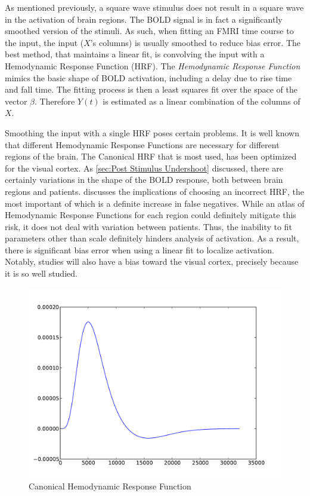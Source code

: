 As mentioned previously, a square wave stimulus 
does not result in a square wave in the activation of brain regions. 
The BOLD signal is in fact a significantly smoothed version of the 
stimuli. As such, when fitting an FMRI time course to the input,
the input ($X$'s columns) is usually smoothed to reduce bias error. 
The best method, that maintains a linear fit, is convolving the input 
with a Hemodynamic 
Response Function (HRF). The \emph{Hemodynamic Response Function}
mimics the basic shape of BOLD activation, including a delay
due to rise time and fall time. The fitting 
process is then a least squares fit over the space of the vector $\beta$. 
Therefore $Y(t)$ is estimated as a linear combination 
of the columns of $X$. 

Smoothing the input with a single HRF poses certain problems.
It is well known that different Hemodynamic Response Functions are necessary 
for different regions of the brain. The Canonical HRF that is most used, 
has been optimized for the visual cortex. As \autoref{sec:Post Stimulus Undershoot}
discussed, there are certainly variations in the shape of the
BOLD response, both between brain regions and patients.  \cite{Handwerker2004}
discusses the implications of choosing an incorrect HRF, the most important
of which is a definite increase in false negatives. While an atlas
of Hemodynamic Response Functions for each region could definitely 
mitigate this risk, it does not deal with variation between patients.
Thus, the inability to fit parameters other than scale definitely hinders 
analysis of activation. As a result, there is significant bias error
when using a linear fit to localize activation. Notably, studies
will also have a bias toward the visual cortex, precisely because
it is so well studied.

\begin{figure}
\centering
\includegraphics[scale=.7]{images/HRF}
\caption{Canonical Hemodynamic Response Function}
\label{fig:HRF}
\end{figure}

